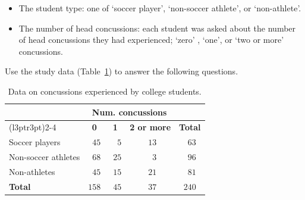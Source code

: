 \documentclass[
  11pt,
  a4paper,
  krantz2]{krantz}
\providecommand{\tightlist}{%
  \setlength{\itemsep}{0pt}\setlength{\parskip}{0pt}}
\begin{document}
\begin{itemize}
\tightlist
\item
  The student type: one of `soccer player', `non-soccer athlete', or `non-athlete'.
\item
  The number of head concussions: each student was asked about the number of head concussions they had experienced; `zero' , `one', or `two or more' concussions.
\end{itemize}

Use the study data (Table~\ref{tab:SoccerTable}) to answer the following questions.

\begin{table}
\centering
\caption{\label{tab:SoccerTable}Data on concussions experienced by college students.}
\centering
\fontsize{10}{12}\selectfont
\begin{tabular}[t]{lccc>{}c}
\toprule
\multicolumn{1}{c}{\textbf{ }} & \multicolumn{3}{c}{\textbf{Num. concussions}} & \multicolumn{1}{c}{\textbf{ }} \\
\cmidrule(l{3pt}r{3pt}){2-4}
\textbf{ } & \textbf{0} & \textbf{1} & \textbf{2 or more} & \textbf{Total}\\
\midrule
Soccer players & $\phantom{0}45$ & $\phantom{0}\phantom{0}5$ & $\phantom{0}13$ & \textbf{$\phantom{0}63$}\\
Non-soccer athletes & $\phantom{0}68$ & $\phantom{0}25$ & $\phantom{0}\phantom{0}3$ & \textbf{$\phantom{0}96$}\\
Non-athletes & $\phantom{0}45$ & $\phantom{0}15$ & $\phantom{0}21$ & \textbf{$\phantom{0}81$}\\
\midrule
\textbf{Total} & \textbf{$158$} & \textbf{$\phantom{0}45$} & \textbf{$\phantom{0}37$} & \textbf{\textbf{$240$}}\\
\bottomrule
\end{tabular}
\end{table}
\end{document}
